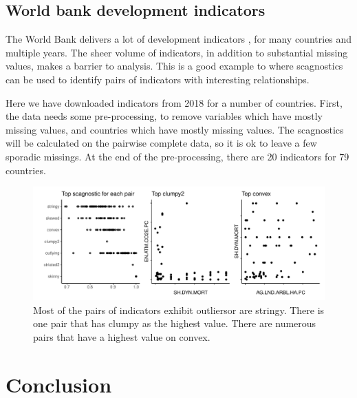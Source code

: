 \hypertarget{world-bank-development-indicators}{%
\subsection{World bank development
indicators}\label{world-bank-development-indicators}}

The World Bank delivers a lot of development indicators \citep{WBI}, for
many countries and multiple years. The sheer volume of indicators, in
addition to substantial missing values, makes a barrier to analysis.
This is a good example to where scagnostics can be used to identify
pairs of indicators with interesting relationships.

Here we have downloaded indicators from 2018 for a number of countries.
First, the data needs some pre-processing, to remove variables which
have mostly missing values, and countries which have mostly missing
values. The scagnostics will be calculated on the pairwise complete
data, so it is ok to leave a few sporadic missings. At the end of the
pre-processing, there are 20 indicators for 79 countries.

\begin{Schunk}
\begin{figure}
\includegraphics[width=1\linewidth]{mason-lee-laa-cook_files/figure-latex/wbistatic-1} \caption[Most of the pairs of indicators exhibit outliersor are stringy]{Most of the pairs of indicators exhibit outliersor are stringy. There is one pair that has clumpy as the highest value. There are numerous pairs that have a highest value on convex.}\label{fig:wbistatic}
\end{figure}
\end{Schunk}

\hypertarget{conclusion}{%
\section{Conclusion}\label{conclusion}}

